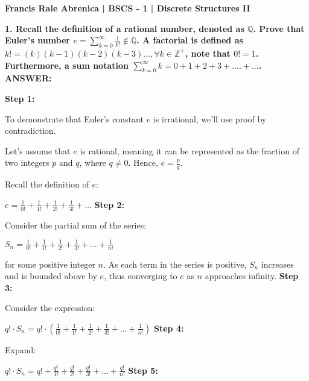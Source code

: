 \documentclass{article}
\begin{document}
\begin{flushleft}

\textbf{Francis Rale Abrenica   |   BSCS - 1   |    Discrete Structures II}
\newline

\textbf{1. Recall the definition of a rational number, denoted as $\mathbb{Q}$. Prove that Euler's number $e = \sum_{k=0}^\infty \frac{1}{k!} \notin \mathbb{Q}$. A factorial is defined as $k! = (k)(k-1)(k-2)(k-3)..., \forall k \in \mathbb{Z}^+$, note that $0! = 1$. Furthermore, a sum notation $\sum_{k=0}^\infty k = 0+ 1 + 2 + 3 +....+...$.}
\newline\newline
\textbf{ANSWER:}

\textbf{Step 1:}

To demonstrate that Euler's constant $e$ is irrational, we'll use proof by contradiction.

Let's assume that $e$ is rational, meaning it can be represented as the fraction of two integers $p$ and $q$, where $q \neq 0$. Hence, $e = \frac{p}{q}$.

Recall the definition of $e$: 

$ e = \frac{1}{0!} + \frac{1}{1!} + \frac{1}{2!} + \frac{1}{3!} + \ldots $
\newline\newline
\textbf{Step 2:}

Consider the partial sum of the series:

$ S_n = \frac{1}{0!} + \frac{1}{1!} + \frac{1}{2!} + \frac{1}{3!} + \ldots + \frac{1}{n!} $

for some positive integer $n$. As each term in the series is positive, $S_n$ increases and is bounded above by $e$, thus converging to $e$ as $n$ approaches infinity.
\newline\newline
\textbf{Step 3:}

Consider the expression:

$ q! \cdot S_n = q! \cdot \left(\frac{1}{0!} + \frac{1}{1!} + \frac{1}{2!} + \frac{1}{3!} + \ldots + \frac{1}{n!}\right) $
\newline\newline
\textbf{Step 4:}

Expand:

$ q! \cdot S_n = q! + \frac{q!}{1!} + \frac{q!}{2!} + \frac{q!}{3!} + \ldots + \frac{q!}{n!} $
\newline\newline
\textbf{Step 5:}


\end{flushleft}
\end{document}
